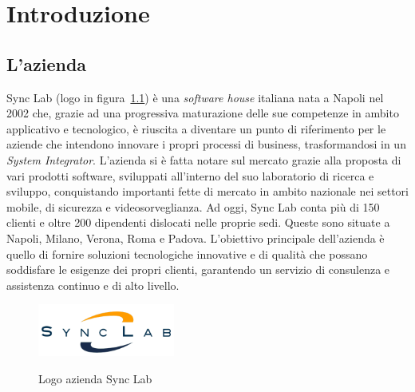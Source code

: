 \chapter{Introduzione}\label{cap:introduzione}


\section{L'azienda}\label{sec:azienda}

Sync Lab (logo in figura~\ref{fig:logo-synclab}) è una \textit{software house} italiana 
nata a Napoli nel 2002 che, grazie ad una progressiva
maturazione delle sue competenze in ambito applicativo e tecnologico, è riuscita a diventare un
punto di riferimento per le aziende che intendono innovare i propri processi di business,
trasformandosi in un \textit{System Integrator}. L'azienda si è fatta notare sul mercato grazie alla proposta
di vari prodotti software, sviluppati all'interno del suo laboratorio di ricerca e sviluppo, 
conquistando importanti fette di mercato in ambito nazionale nei settori mobile, di sicurezza e videosorveglianza.
Ad oggi, Sync Lab conta più di 150 clienti e oltre 200 dipendenti dislocati nelle proprie sedi.
Queste sono situate a Napoli, Milano, Verona, Roma e Padova.
L'obiettivo principale dell'azienda è quello di fornire soluzioni tecnologiche innovative e di qualità
che possano soddisfare le esigenze dei propri clienti, garantendo un servizio di consulenza
e assistenza continuo e di alto livello.\\

\begin{figure}[ht]
    \centering
    \includegraphics[width=0.4\textwidth, alt={Logo dell'azienda Sync Lab}]{immagini/synclab.png}
    \caption{Logo azienda Sync Lab}\label{fig:logo-synclab}
\end{figure}

\newpage

